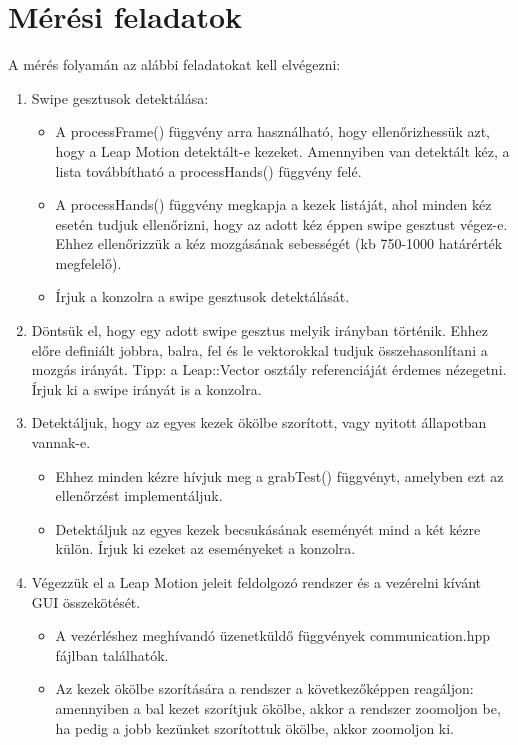 \chapter{Mérési feladatok}\label{sect:LatexTools}
%

A mérés folyamán az alábbi feladatokat kell elvégezni:
\begin{enumerate}
	\item Swipe gesztusok detektálása:
		\begin{itemize}
			\item A processFrame() függvény arra használható, hogy ellenőrizhessük azt, hogy a Leap Motion detektált-e kezeket. Amennyiben van detektált kéz, a lista továbbítható a processHands() függvény felé.
			\item A processHands() függvény megkapja a kezek listáját, ahol minden kéz esetén tudjuk ellenőrizni, hogy az adott kéz éppen swipe gesztust végez-e. Ehhez ellenőrizzük a kéz mozgásának sebességét (kb 750-1000 határérték megfelelő).
			\item Írjuk a konzolra a swipe gesztusok detektálását.
		\end{itemize}
	\item Döntsük el, hogy egy adott swipe gesztus melyik irányban történik. Ehhez előre definiált jobbra, balra, fel és le vektorokkal tudjuk összehasonlítani a mozgás irányát. Tipp: a Leap::Vector osztály referenciáját érdemes nézegetni. Írjuk ki a swipe irányát is a konzolra.
	\item Detektáljuk, hogy az egyes kezek ökölbe szorított, vagy nyitott állapotban vannak-e.
		\begin{itemize}
			\item Ehhez minden kézre hívjuk meg a grabTest() függvényt, amelyben ezt az ellenőrzést implementáljuk.
			\item Detektáljuk az egyes kezek becsukásának eseményét mind a két kézre külön. Írjuk ki ezeket az eseményeket a konzolra.
		\end{itemize}
	\item Végezzük el a Leap Motion jeleit feldolgozó rendszer és a vezérelni kívánt GUI összekötését.
	\begin{itemize}
		\item A vezérléshez meghívandó üzenetküldő függvények communication.hpp fájlban találhatók.
		\item Az kezek ökölbe szorítására a rendszer a következőképpen reagáljon: amennyiben a bal kezet szorítjuk ökölbe, akkor a rendszer zoomoljon be, ha pedig a jobb kezünket szorítottuk ökölbe, akkor zoomoljon ki.
	\end{itemize}
	

\end{enumerate}
